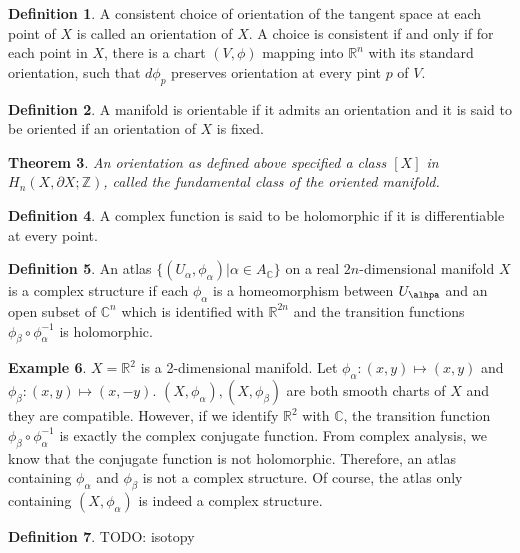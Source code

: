 \documentclass[11pt, psamsfonts]{amsart}
\newtheorem{thm}{Theorem}[section]
\theoremstyle{definition}
\newtheorem{defn}[thm]{Definition}
\newtheorem{exmp}[thm]{Example}
\theoremstyle{remark}
\numberwithin{equation}{section}
\begin{document}
\begin{defn}
  A consistent choice of orientation of the tangent space at each point of $X$ is called an orientation of $X$.
  A choice is consistent if and only if for each point in $X$, there is a chart $(V, \phi)$ mapping into $\mathbb{R}^n$ with its standard orientation, such that $d\phi_p$ preserves orientation at every pint $p$ of $V$.
\end{defn}

\begin{defn}
  A manifold is orientable if it admits an orientation and it is said to be oriented if an orientation of $X$ is fixed.
\end{defn}

\begin{thm}
  An orientation as defined above specified a class $[X]$ in $H_n(X, \partial X; \mathbb{Z})$, called the fundamental class of the oriented manifold.
\end{thm}

\begin{defn}
  A complex function is said to be holomorphic if it is differentiable at every point.
\end{defn}

\begin{defn}
  An atlas $\{ (U_{\alpha}, \phi_{\alpha}) \vert \alpha \in A_{\mathbb{C}} \}$ on a real $2n$-dimensional manifold $X$ is a complex structure if each $\phi_{\alpha}$ is a homeomorphism between $U_{\alhpa}$ and an open subset of $\mathbb{C}^n$ which is identified with $\mathbb{R}^{2n}$ and the transition functions $\phi_{\beta} \circ \phi_{\alpha}^{-1}$ is holomorphic.
\end{defn}

\begin{exmp}
  $X = \mathbb{R}^2$ is a 2-dimensional manifold.
  Let $\phi_{\alpha}: (x, y) \mapsto (x, y)$ and $\phi_{\beta}: (x, y) \mapsto(x, -y)$.
  $(X, \phi_{\alpha}), (X, \phi_{\beta})$ are both smooth charts of $X$ and they are compatible.
  However, if we identify $\mathbb{R}^2$ with $\mathbb{C}$, the transition function $\phi_{\beta} \circ \phi_{\alpha}^{-1}$ is exactly the complex conjugate function.
  From complex analysis, we know that the conjugate function is not holomorphic.
  Therefore, an atlas containing $\phi_{\alpha}$ and $\phi_{\beta}$ is not a complex structure.
  Of course, the atlas only containing $(X, \phi_{\alpha})$ is indeed a complex structure.
\end{exmp}

\begin{defn}
  TODO: isotopy
\end{defn}
\end{document}
